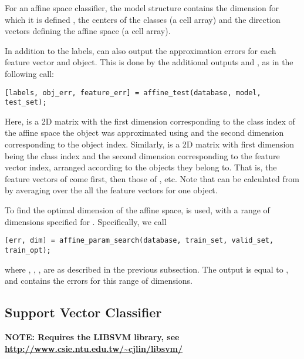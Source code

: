 \documentclass{article}
\begin{document}
For an affine space classifier, the model structure contains the dimension for which it is defined , the centers of the classes  (a cell array) and the direction vectors defining the affine space  (a cell array).

In addition to the labels,  can also output the approximation errors for each feature vector and object. This is done by the additional outputs  and , as in the following call:
\begin{lstlisting}
[labels, obj_err, feature_err] = affine_test(database, model, test_set);
\end{lstlisting}
Here,  is a 2D matrix with the first dimension corresponding to the class index of the affine space the object was approximated using and the second dimension corresponding to the object index. Similarly,  is a 2D matrix with first dimension being the class index and the second dimension corresponding to the feature vector index, arranged according to the objects they belong to. That is, the feature vectors of  come first, then those of , etc. Note that  can be calculated from  by averaging over the all the feature vectors for one object.

To find the optimal dimension of the affine space,  is used, with a range of dimensions specified for . Specifically, we call
\begin{lstlisting}
[err, dim] = affine_param_search(database, train_set, valid_set, train_opt);
\end{lstlisting}
where , , ,  are as described in the previous subsection. The output  is equal to , and  contains the errors for this range of dimensions.

\subsection{Support Vector Classifier}

\textbf{NOTE: Requires the LIBSVM library, see \url{http://www.csie.ntu.edu.tw/~cjlin/libsvm/}}
\end{document}
